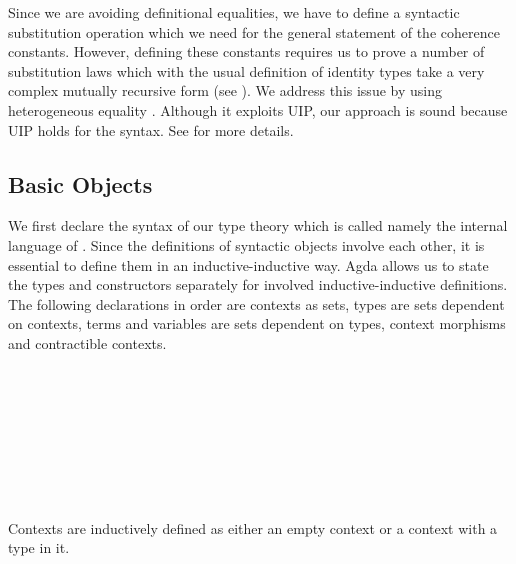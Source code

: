 Since we are avoiding definitional equalities, we have to define a
syntactic substitution operation which we need for the general
statement of the coherence constants. However, defining these
constants requires us to prove a number of substitution laws which
with the usual definition of identity types take a very
complex mutually recursive form (see \cite{txa:csl}). We address this
issue by using heterogeneous equality \cite{mcbride:elimination}. Although 
it exploits UIP, our approach is sound because UIP holds for the
syntax. See  for more details.

\subsection{Basic Objects}

We first declare the syntax of our type theory which is
called \tig{} namely the internal language of \wog. Since the definitions of syntactic objects involve each other, it is essential to define them in an inductive-inductive way. Agda allows us to state the types and constructors separately for involved inductive-inductive definitions. The following declarations in order are contexts as sets,
types are sets dependent on contexts, terms and variables are sets
dependent on types, context morphisms and contractible contexts.

\begin{code}\>\<%
\\
\>  \<[19]%
\>[19]\AgdaSymbol{:} \<%
\\
\>  \AgdaSymbol{(} \AgdaSymbol{:} \AgdaSymbol{)} \<[19]%
\>[19]\AgdaSymbol{:} \<%
\\
\>  \<[19]%
\>[19]\AgdaSymbol{:} \AgdaSymbol{\{} \AgdaSymbol{:} \AgdaSymbol{\}(} \AgdaSymbol{:}  \AgdaSymbol{)}  \<%
\\
\>  \<[19]%
\>[19]\AgdaSymbol{:} \AgdaSymbol{\{} \AgdaSymbol{:} \AgdaSymbol{\}(} \AgdaSymbol{:}  \AgdaSymbol{)}  \<%
\\
\>  \<[19]%
\>[19]\AgdaSymbol{:}     \<%
\\
\>  \<[19]%
\>[19]\AgdaSymbol{:}   \<%
\\
\>\<\end{code}
Contexts are inductively defined as either an empty context or
a context with a type in it.


